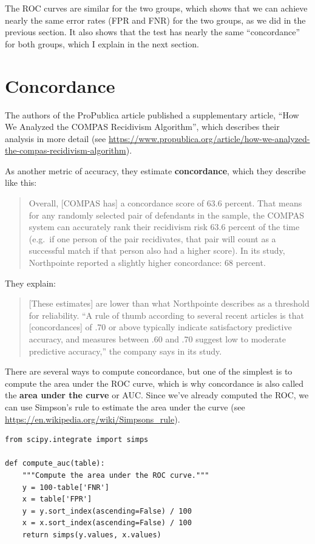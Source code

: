 The ROC curves are similar for the two groups, which shows that we can
achieve nearly the same error rates (FPR and FNR) for the two groups, as
we did in the previous section. It also shows that the test has nearly
the same ``concordance'' for both groups, which I explain in the next
section.

\hypertarget{concordance}{%
\section{Concordance}\label{concordance}}

The authors of the ProPublica article published a supplementary article,
``How We Analyzed the COMPAS Recidivism Algorithm'', which describes
their analysis in more detail (see
\url{https://www.propublica.org/article/how-we-analyzed-the-compas-recidivism-algorithm}).

As another metric of accuracy, they estimate \textbf{concordance}, which
they describe like this:

\begin{quote}
Overall, {[}COMPAS has{]} a concordance score of 63.6 percent. That
means for any randomly selected pair of defendants in the sample, the
COMPAS system can accurately rank their recidivism risk 63.6 percent of
the time (e.g.~if one person of the pair recidivates, that pair will
count as a successful match if that person also had a higher score). In
its study, Northpointe reported a slightly higher concordance: 68
percent.
\end{quote}

They explain:

\begin{quote}
{[}These estimates{]} are lower than what Northpointe describes as a
threshold for reliability. ``A rule of thumb according to several recent
articles is that {[}concordances{]} of .70 or above typically indicate
satisfactory predictive accuracy, and measures between .60 and .70
suggest low to moderate predictive accuracy,'' the company says in its
study.
\end{quote}

There are several ways to compute concordance, but one of the simplest
is to compute the area under the ROC curve, which is why concordance is
also called the \textbf{area under the curve} or AUC. Since we've
already computed the ROC, we can use Simpson's rule to estimate the area
under the curve (see \url{https://en.wikipedia.org/wiki/Simpsons_rule}).

\begin{lstlisting}[]
from scipy.integrate import simps

def compute_auc(table):
    """Compute the area under the ROC curve."""
    y = 100-table['FNR']
    x = table['FPR']
    y = y.sort_index(ascending=False) / 100
    x = x.sort_index(ascending=False) / 100
    return simps(y.values, x.values)
\end{lstlisting}

